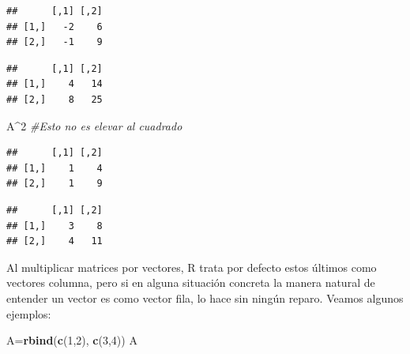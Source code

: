 \documentclass[]{book}
\newenvironment{Shaded}{\begin{snugshade}}{\end{snugshade}}
\newcommand{\CommentTok}[1]{\textcolor[rgb]{0.56,0.35,0.01}{\textit{#1}}}
\newcommand{\DecValTok}[1]{\textcolor[rgb]{0.00,0.00,0.81}{#1}}
\newcommand{\KeywordTok}[1]{\textcolor[rgb]{0.13,0.29,0.53}{\textbf{#1}}}
\newcommand{\NormalTok}[1]{#1}
\newcommand{\OperatorTok}[1]{\textcolor[rgb]{0.81,0.36,0.00}{\textbf{#1}}}
\theoremstyle{definition}
\theoremstyle{definition}
\theoremstyle{definition}
\theoremstyle{remark}
\begin{document}
\begin{Shaded}
\end{Shaded}

\begin{verbatim}
##      [,1] [,2]
## [1,]   -2    6
## [2,]   -1    9
\end{verbatim}

\begin{Shaded}
\end{Shaded}

\begin{verbatim}
##      [,1] [,2]
## [1,]    4   14
## [2,]    8   25
\end{verbatim}

\begin{Shaded}
\begin{Highlighting}[]
\NormalTok{A}\OperatorTok{^}\DecValTok{2} \CommentTok{#Esto no es elevar al cuadrado}
\end{Highlighting}
\end{Shaded}

\begin{verbatim}
##      [,1] [,2]
## [1,]    1    4
## [2,]    1    9
\end{verbatim}

\begin{Shaded}
\end{Shaded}

\begin{verbatim}
##      [,1] [,2]
## [1,]    3    8
## [2,]    4   11
\end{verbatim}

Al multiplicar matrices por vectores, R trata por defecto estos últimos como vectores columna, pero si en alguna situación concreta la manera natural de entender un vector es como vector fila, lo hace sin ningún reparo. Veamos algunos ejemplos:

\begin{Shaded}
\begin{Highlighting}[]
\NormalTok{A=}\KeywordTok{rbind}\NormalTok{(}\KeywordTok{c}\NormalTok{(}\DecValTok{1}\NormalTok{,}\DecValTok{2}\NormalTok{), }\KeywordTok{c}\NormalTok{(}\DecValTok{3}\NormalTok{,}\DecValTok{4}\NormalTok{))}
\NormalTok{A}
\end{Highlighting}
\end{Shaded}
\end{document}
